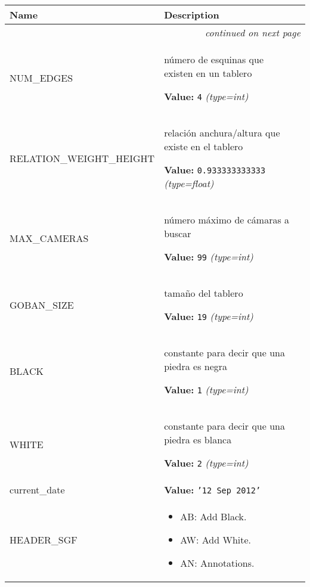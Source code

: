     \vspace{-1cm}
\hspace{\varindent}\begin{longtable}{|p{\varnamewidth}|p{\vardescrwidth}|l}
\cline{1-2}
\cline{1-2} \centering \textbf{Name} & \centering \textbf{Description}& \\
\cline{1-2}
\endhead\cline{1-2}\multicolumn{3}{r}{\small\textit{continued on next page}}\\\endfoot\cline{1-2}
\endlastfoot\raggedright N\-U\-M\-\_\-E\-D\-G\-E\-S\- & \raggedright número de esquinas que existen en un tablero

\textbf{Value:} 
{\tt 4}            {\it (type=int)}&\\
\cline{1-2}
\raggedright R\-E\-L\-A\-T\-I\-O\-N\-\_\-W\-E\-I\-G\-H\-T\-\_\-H\-E\-I\-G\-H\-T\- & \raggedright relación anchura/altura que existe en el tablero

\textbf{Value:} 
{\tt 0.933333333333}            {\it (type=float)}&\\
\cline{1-2}
\raggedright M\-A\-X\-\_\-C\-A\-M\-E\-R\-A\-S\- & \raggedright número máximo de cámaras a buscar

\textbf{Value:} 
{\tt 99}            {\it (type=int)}&\\
\cline{1-2}
\raggedright G\-O\-B\-A\-N\-\_\-S\-I\-Z\-E\- & \raggedright tamaño del tablero

\textbf{Value:} 
{\tt 19}            {\it (type=int)}&\\
\cline{1-2}
\raggedright B\-L\-A\-C\-K\- & \raggedright constante para decir que una piedra es negra

\textbf{Value:} 
{\tt 1}            {\it (type=int)}&\\
\cline{1-2}
\raggedright W\-H\-I\-T\-E\- & \raggedright constante para decir que una piedra es blanca

\textbf{Value:} 
{\tt 2}            {\it (type=int)}&\\
\cline{1-2}
\raggedright c\-u\-r\-r\-e\-n\-t\-\_\-d\-a\-t\-e\- & \raggedright \textbf{Value:} 
{\tt \texttt{'}\texttt{12 Sep 2012}\texttt{'}}&\\
\cline{1-2}
\raggedright H\-E\-A\-D\-E\-R\-\_\-S\-G\-F\- & \raggedright %
\begin{itemize}

\item AB: Add Black.

\item AW: Add White.

\item AN: Annotations.


\end{itemize}
\end{longtable}
